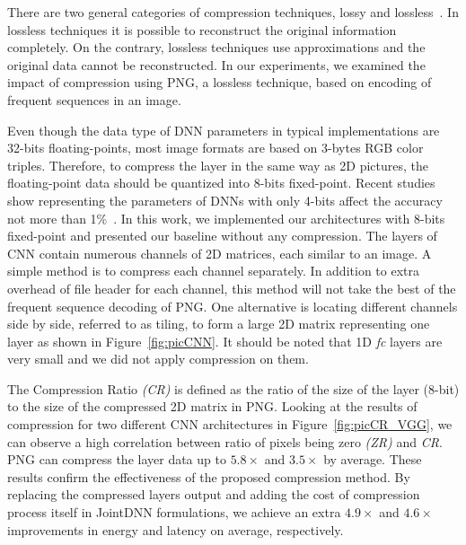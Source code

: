 There are two general categories of compression techniques, lossy and lossless~\cite{InformationTheoryCover}. In lossless techniques it is possible to reconstruct the original information completely. On the contrary, lossless techniques use approximations and the original data cannot be reconstructed. In our experiments, we examined the impact of compression using PNG, a lossless technique, based on encoding of frequent sequences in an image. 

Even though the data type of DNN parameters in typical implementations are 32-bits floating-points, most image formats are based on 3-bytes RGB color triples. Therefore, to compress the layer in the same way as 2D pictures, the floating-point data should be quantized into 8-bits fixed-point. Recent studies show representing the parameters of DNNs with only 4-bits affect the accuracy not more than 1\%~\cite{efficientDNN}. In this work, we implemented our architectures with 8-bits fixed-point and presented our baseline without any compression. 
The layers of CNN contain numerous channels of 2D matrices, each similar to an image. A simple method is to compress each channel separately. In addition to extra overhead of file header for each channel, this method will not take the best of the frequent sequence decoding of PNG. One alternative is locating different channels side by side, referred to as tiling, to form a large 2D matrix representing one layer as shown in Figure~\ref{fig:picCNN}. It should be noted that 1D \textit{fc} layers are very small and we did not apply compression on them.

The Compression Ratio \textit{(CR)} is defined as the ratio of the size of the layer (8-bit) to the size of the compressed 2D matrix in PNG. Looking at the results of compression for two different CNN architectures in Figure~\ref{fig:picCR_VGG}, we can observe a high correlation between ratio of pixels being zero \textit{(ZR)} and \textit{CR}. PNG can compress the layer data up to $5.8\times$ and $3.5\times$ by average. These results confirm the effectiveness of the proposed compression method. By replacing the compressed layers output and adding the cost of compression process itself in JointDNN formulations, we achieve an extra $4.9\times$ and $4.6\times$ improvements in energy and latency on average, respectively.

